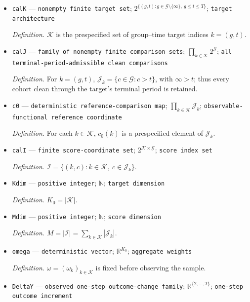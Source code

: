 \documentclass{article}
\begin{document}
\begin{itemize}
  \item \texttt{calK} --- \texttt{nonempty finite target set}; \(2^{\{(g,t):g\in\mathcal G\setminus\{\infty\},\ g\le t\le T\}}\); \texttt{target architecture}
  \par\smallskip\noindent\emph{Definition.} \(\mathcal K\) is the prespecified set of group--time target indices \(k=(g,t)\).
  \item \texttt{calJ} --- \texttt{family of nonempty finite comparison sets}; \(\prod_{k\in\mathcal K}2^{\mathcal G}\); \texttt{all terminal-\allowbreak{}period-\allowbreak{}admissible clean comparisons}
  \par\smallskip\noindent\emph{Definition.} For \(k=(g,t)\), \(\mathcal J_k=\{c\in\mathcal G:c>t\}\), with \(\infty>t\); thus every cohort clean through the target's terminal period is retained.
  \item \texttt{c0} --- \texttt{deterministic reference-\allowbreak{}comparison map}; \(\prod_{k\in\mathcal K}\mathcal J_k\); \texttt{observable-\allowbreak{}functional reference coordinate}
  \par\smallskip\noindent\emph{Definition.} For each \(k\in\mathcal K\), \(c_0(k)\) is a prespecified element of \(\mathcal J_k\).
  \item \texttt{calI} --- \texttt{finite score-\allowbreak{}coordinate set}; \(2^{\mathcal K\times\mathcal G}\); \texttt{score index set}
  \par\smallskip\noindent\emph{Definition.} \(\mathcal I=\{(k,c):k\in\mathcal K,\ c\in\mathcal J_k\}\).
  \item \texttt{Kdim} --- \texttt{positive integer}; \(\mathbb N\); \texttt{target dimension}
  \par\smallskip\noindent\emph{Definition.} \(K_0=|\mathcal K|\).
  \item \texttt{Mdim} --- \texttt{positive integer}; \(\mathbb N\); \texttt{score dimension}
  \par\smallskip\noindent\emph{Definition.} \(M=|\mathcal I|=\sum_{k\in\mathcal K}|\mathcal J_k|\).
  \item \texttt{omega} --- \texttt{deterministic vector}; \(\mathbb R^{K_0}\); \texttt{aggregate weights}
  \par\smallskip\noindent\emph{Definition.} \(\omega=(\omega_k)_{k\in\mathcal K}\) is fixed before observing the sample.
  \item \texttt{DeltaY} --- \texttt{observed one-\allowbreak{}step outcome-\allowbreak{}change family}; \(\mathbb R^{\{2,\ldots,T\}}\); \texttt{one-\allowbreak{}step outcome increment}

\end{itemize}
\end{document}
